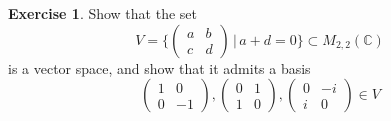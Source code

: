 \documentclass[11pt, reqno]{amsart}
\theoremstyle{definition} %
\newtheorem{exercise}[theorem]{Exercise}
\newcommand{\C}{\mathbb{C}}
\begin{document}
\begin{exercise}
    Show that the set 
    \begin{equation}
        V=
        \{\begin{pmatrix}
            a & b\\
            c & d
        \end{pmatrix}
        \,|\,a+d=0\}\subset M_{2,2}(\C)
    \end{equation}
    is a vector space, and show that it admits a basis
    \begin{equation}
        \begin{pmatrix}
            1 & 0\\
            0 & -1
        \end{pmatrix}
        ,
        \begin{pmatrix}
            0 & 1\\
            1 & 0
        \end{pmatrix}
        ,
        \begin{pmatrix}
            0 & -i\\
            i & 0
        \end{pmatrix}
        \in V
    \end{equation}
\end{exercise}
\end{document}
